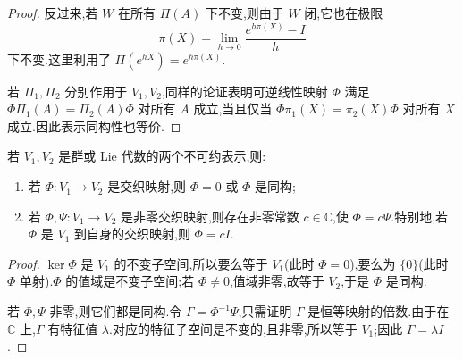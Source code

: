 {\begin{proof}
反过来,若 $W$ 在所有 $\Pi(A)$ 下不变,则由于 $W$ 闭,它也在极限
\[
\pi(X)=\lim_{h\to0}\frac{e^{h\pi(X)}-I}{h}
\]
下不变.这里利用了 $\Pi(e^{hX})=e^{h\pi(X)}$.

若 $\Pi_1,\Pi_2$ 分别作用于 $V_1,V_2$,同样的论证表明可逆线性映射 $\Phi$ 满足 $\Phi\Pi_1(A)=\Pi_2(A)\Phi$ 对所有 $A$ 成立,当且仅当 $\Phi\pi_1(X)=\pi_2(X)\Phi$ 对所有 $X$ 成立.因此表示同构性也等价.
\end{proof}

\begin{theorem}[Schur 引理]\label{thm:schur-lemma}
若 $V_1,V_2$ 是群或 Lie 代数的两个不可约表示,则:
\begin{enumerate}
\item 若 $\Phi:V_1\to V_2$ 是交织映射,则 $\Phi=0$ 或 $\Phi$ 是同构;
\item 若 $\Phi,\Psi:V_1\to V_2$ 是非零交织映射,则存在非零常数 $c\in\mathbb C$,使 $\Phi=c\Psi$.特别地,若 $\Phi$ 是 $V_1$ 到自身的交织映射,则 $\Phi=cI$.
\end{enumerate}
\end{theorem}

\begin{proof}
$\ker\Phi$ 是 $V_1$ 的不变子空间,所以要么等于 $V_1$(此时 $\Phi=0$),要么为 $\{0\}$(此时 $\Phi$ 单射).$\Phi$ 的值域是不变子空间;若 $\Phi\neq0$,值域非零,故等于 $V_2$,于是 $\Phi$ 是同构.

若 $\Phi,\Psi$ 非零,则它们都是同构.令 $\Gamma=\Phi^{-1}\Psi$,只需证明 $\Gamma$ 是恒等映射的倍数.由于在 $\mathbb C$ 上,$\Gamma$ 有特征值 $\lambda$.对应的特征子空间是不变的,且非零,所以等于 $V_1$;因此 $\Gamma=\lambda I$.
\end{proof}

}

